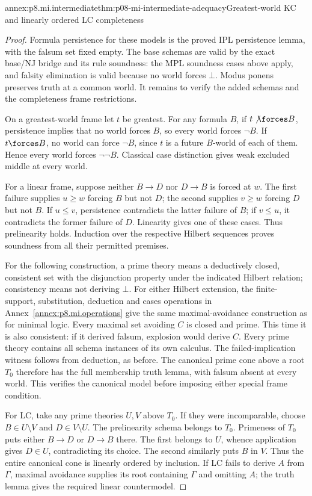 \begin{annexitem}{annex:p8.mi.intermediate}{thm:p08-mi-intermediate-adequacy}{Greatest-world KC and linearly ordered LC completeness}
\begin{proof}
Formula persistence for these models is the proved IPL persistence lemma,
with the falsum set fixed empty. The base schemas are valid by the exact
base/NJ bridge and its rule soundness: the MPL soundness cases above
apply, and falsity elimination is valid because no world forces \(\bot\).
Modus ponens preserves truth at a common world. It remains to verify the
added schemas and the completeness frame restrictions.

On a greatest-world frame let \(t\) be greatest. For any formula \(B\),
if \(t\not\forces B\), persistence implies that no world forces
\(B\), so every world forces \(\neg B\). If \(t\forces B\), no
world can force \(\neg B\), since \(t\) is a future \(B\)-world
of each of them. Hence every world forces \(\neg\neg B\).
Classical case distinction gives weak excluded middle at every world.

For a linear frame, suppose neither \(B\to D\) nor \(D\to B\)
is forced at \(w\). The first failure supplies \(u\geq w\)
forcing \(B\) but not \(D\); the second supplies \(v\geq w\)
forcing \(D\) but not \(B\). If \(u\leq v\), persistence
contradicts the latter failure of \(B\); if \(v\leq u\), it
contradicts the former failure of \(D\). Linearity gives one of
these cases. Thus prelinearity holds. Induction over the respective
Hilbert sequences proves soundness from all their permitted premises.

For the following construction, a prime theory means a deductively closed,
consistent set with the disjunction property under the indicated Hilbert
relation; consistency means not deriving \(\bot\).
For either Hilbert extension, the finite-support, substitution, deduction
and cases operations in Annex~\ref{annex:p8.mi.operations} give the
same maximal-avoidance construction as for minimal logic. Every maximal
set avoiding \(C\) is closed and prime. This time it is also
consistent: if it derived falsum, explosion would derive \(C\).
Every prime theory contains all schema instances of its own calculus.
The failed-implication witness follows from deduction, as before.
The canonical prime cone above a root \(T_0\) therefore has the full
membership truth lemma, with falsum absent at every world. This verifies
the canonical model before imposing either special frame condition.

For LC, take any prime theories \(U,V\) above \(T_0\). If they
were incomparable, choose \(B\in U\setminus V\) and
\(D\in V\setminus U\). The prelinearity schema belongs to \(T_0\).
Primeness of \(T_0\) puts either \(B\to D\) or \(D\to B\)
there. The first belongs to \(U\), whence application gives
\(D\in U\), contradicting its choice. The second similarly
puts \(B\) in \(V\). Thus the entire canonical cone is linearly
ordered by inclusion. If LC fails to derive \(A\) from \(\Gamma\),
maximal avoidance supplies its root containing \(\Gamma\) and
omitting \(A\); the truth lemma gives the required linear countermodel.


\end{proof}
\end{annexitem}

